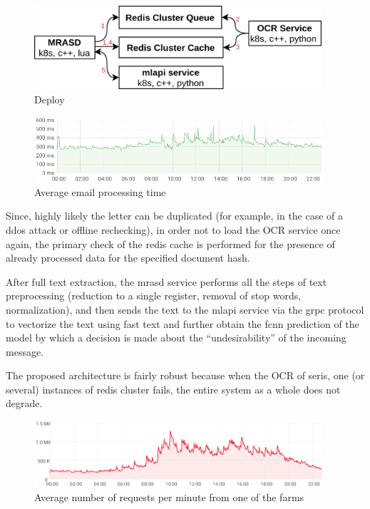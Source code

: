 \documentclass[12pt]{jpconf}
\begin{document}
\begin{figure}[t]
	\center
	\includegraphics[width=0.95\textwidth]{images/deploy.jpg}
	\caption{\label{fig:01} Deploy}
\end{figure}

\begin{figure}[b]
	\center
	\includegraphics[width=0.95\textwidth]{images/timings.png}
	\caption{\label{fig:02} Average email processing time}	
\end{figure}


Since, highly likely the letter can be duplicated (for example, in the case of a ddos attack or offline rechecking), in order not to load the OCR service once again, the primary check of the redis cache is performed for the presence of already processed data for the specified document hash.

After full text extraction, the mrasd service performs all the steps of text preprocessing (reduction to a single register, removal of stop words, normalization), and then sends the text to the mlapi service via the grpc protocol to vectorize the text using fast text and further obtain the fcnn prediction of the model by which a decision is made about the ``undesirability'' of the incoming message.

The proposed architecture is fairly robust because when the OCR of seris, one (or several) instances of redis cluster fails, the entire system as a whole does not degrade.
 
\begin{figure}[t]
	\center
	\includegraphics[width=0.95\textwidth]{images/processed_messages.png}
	\caption{\label{fig:03} Average number of requests per minute from one of the farms}
\end{figure}
\end{document}
